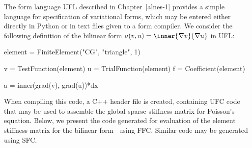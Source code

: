 The form language UFL described in Chapter~[alnes-1] provides a simple
language for specification of variational forms, which may be entered
either directly in Python or in text files given to a form compiler.
We consider the following definition of the bilinear form $a(v, u) =
\inner{\nabla v}{\nabla u}$ in UFL:
\begin{code}
element = FiniteElement("CG", "triangle", 1)

v = TestFunction(element)
u = TrialFunction(element)
f = Coefficient(element)

a = inner(grad(v), grad(u))*dx
\end{code}

When compiling this code, a C++ header file is created, containing UFC
code that may be used to assemble the global sparse stiffness matrix
for Poisson's equation. Below, we present the code generated for
evaluation of the element stiffness matrix for the bilinear
form~ using FFC. Similar code may be generated using SFC.

